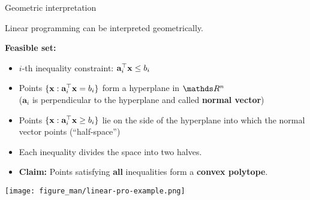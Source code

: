 \documentclass[11pt,compress,t,notes=noshow, xcolor=table]{beamer}
\begin{document}
\begin{vbframe}{Geometric interpretation}

Linear programming can be interpreted geometrically.

\lz

\textbf{Feasible set:}
\begin{itemize}
    \setlength{\itemsep}{1em}
    \item $i$-th inequality constraint: $\mathbf{a}_i^\top \mathbf{x} \le b_i$
    \item Points $\{ \mathbf{x}: \mathbf{a}_i^\top \mathbf{x} = b_i\}$ form a hyperplane in $\R^n$ \\
        ($\mathbf{a}_i$ is perpendicular to the hyperplane and called \textbf{normal vector})
    \item Points $\{\mathbf{x}: \mathbf{a}_i^\top \mathbf{x} \ge b_i\}$ lie on the side of the hyperplane into which the normal vector points (\enquote{half-space})









\framebreak

\item Each inequality divides the space into two halves.
\item \textbf{Claim:} Points satisfying \textbf{all} inequalities form a \textbf{convex polytope}.
\end{itemize}

\begin{center}
    \texttt{[image: figure\_man/linear-pro-example.png]}
\end{center}



\end{vbframe}
\end{document}
